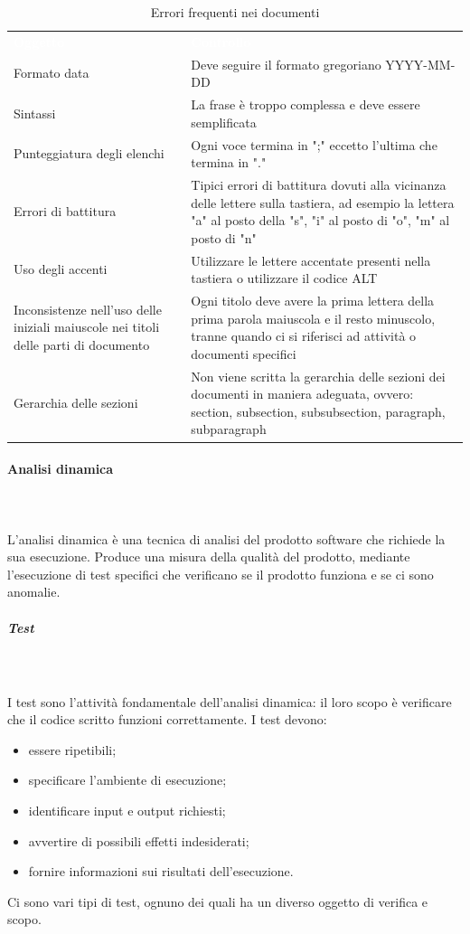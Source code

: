 \begin{table}[H]
\caption{Errori frequenti nei documenti}
\begin{center}
\begin{tabular}{C{4cm} C{12cm}}
\textcolor{white}{\textbf{Oggetto}} & \centerline{\textcolor{white}{\textbf{Controllo}}} \\
Formato data & Deve seguire il formato gregoriano YYYY-MM-DD \\
Sintassi & La frase è troppo complessa e deve essere semplificata \\
Punteggiatura degli elenchi & Ogni voce termina in ";" eccetto l'ultima che termina in "."\\
Errori di battitura & Tipici errori di battitura dovuti alla vicinanza delle
lettere sulla tastiera, ad esempio la lettera "a" al posto della "s", "i" al posto di "o", "m" al posto di "n" \\
Uso degli accenti & Utilizzare le lettere accentate presenti nella tastiera o utilizzare il codice ALT \\
Inconsistenze nell’uso delle iniziali maiuscole nei titoli delle parti di documento & Ogni titolo deve avere la prima lettera della prima parola maiuscola e il resto minuscolo, tranne quando ci si riferisci ad attività o documenti specifici \\
Gerarchia delle sezioni & Non viene scritta la gerarchia delle sezioni dei documenti in maniera adeguata, ovvero: section, subsection, subsubsection, paragraph, subparagraph \\
\end{tabular}
\end{center}
\end{table}

\paragraph*{Analisi dinamica} \mbox{} \\ \mbox{} \\
L'analisi dinamica è una tecnica di analisi del prodotto software che richiede la sua esecuzione. Produce una misura della qualità del prodotto, mediante l'esecuzione di test specifici che verificano se il prodotto funziona e se ci sono anomalie.
\pagebreak
\subparagraph{Test} \mbox{} \\ \mbox{} \\
I test sono l'attività fondamentale dell'analisi dinamica: il loro scopo è verificare che il codice
scritto funzioni correttamente. I test devono:
\begin{itemize}
\item essere ripetibili;
\item specificare l'ambiente di esecuzione;
\item identificare input e output richiesti;
\item avvertire di possibili effetti indesiderati;
\item fornire informazioni sui risultati dell'esecuzione.
\end{itemize}
Ci sono vari tipi di test, ognuno dei quali ha un diverso oggetto di verifica e scopo.

